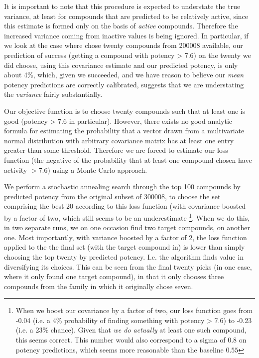 \documentclass[journal=jacsat,manuscript=article]{achemso}
\begin{document}
It is important to note that this procedure is expected to understate the true variance, at least for compounds that are predicted to be relatively active, since this estimate is formed only on the basis of \textit{active} compounds.  Therefore the increased variance coming from inactive values is being ignored. In particular, if we look at the case where chose twenty compounds from 200008 available, our prediction of success (getting a compound with potency > 7.6) on the twenty we did choose, using this covariance estimate and our predicted potency, is only about 4\%, which, given we succeeded, and we have reason to believe our \textit{mean} potency predictions are correctly calibrated, suggests that we are understating the \textit{variance} fairly substantially.

Our objective function is to choose twenty compounds such that at least one is good (potency > 7.6 in particular).  However, there exists no good analytic formula for estimating the probability that a vector drawn from a multivariate normal distribution with arbitrary covariance matrix has at least one entry greater than some threshold.  Therefore we are forced to estimate our loss function (the negative of the probability that at least one compound chosen have activity $> 7.6$) using a Monte-Carlo approach.

We perform a stochastic annealing search through the top 100 compounds by predicted potency from the original subset of 300008, to choose the set comprising the best 20 according to this loss function (with covariance boosted by a factor of two, which still seems to be an underestimate \footnote{When we boost our covariance by a factor of two, our loss function goes from -0.04 (i.e. a 4\% probability of finding something with potency > 7.6) to -0.23 (i.e. a 23\% chance).  Given that \textit{we do actually} at least one such compound, this seems correct.  This number would also correspond to a sigma of $0.8$ on potency predictions, which seems more reasonable than the baseline $0.55$}.  When we do this, in two separate runs, we on one occasion find two target compounds, on another one.  Most importantly, with variance boosted by a factor of $2$, the loss function applied to the the final set (with the target compound in) is lower than simply choosing the top twenty by predicted potency.  I.e. the algorithm finds value in diversifying its choices.  This can be seen from the final twenty picks (in one case, where it only found one target compound), in that it only chooses three compounds from the family in which it originally chose seven.
\end{document}
